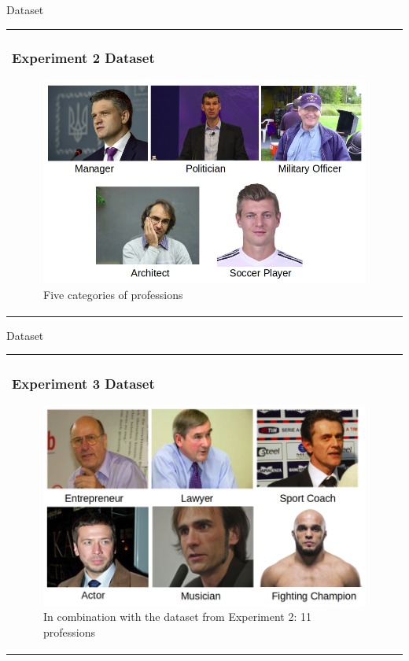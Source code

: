 \documentclass[11pt]{beamer}
\begin{document}
\begin{frame}{Dataset}
\begin{tabular}{l}
\parbox{1\linewidth}{
\frametitle{Experiment 2 Dataset}
\begin{figure}[!tbp]
 \centering
    \includegraphics[width=0.8\columnwidth]{figures/ex2.png}
    \caption{Five categories of professions \cite{data1}}
	\label{fig:prof}
\end{figure}
}
\end{tabular}  
\end{frame}

\begin{frame}{Dataset}
\begin{tabular}{l}
\parbox{1\linewidth}{
\frametitle{Experiment 3 Dataset}
\begin{figure}[!tbp]
 \centering
    \includegraphics[width=0.8\columnwidth]{figures/ex3.png}
    \caption{In combination with the dataset from Experiment 2: 11 professions}
\end{figure}
}
\end{tabular}  
\end{frame}
\end{document}

